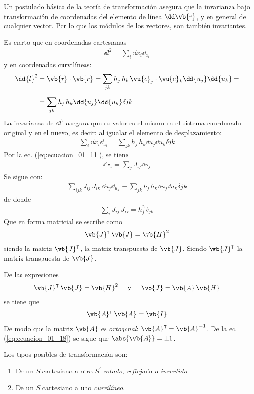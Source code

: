 Un postulado básico de la teoría de transformación asegura que la invarianza bajo transformación de coordenadas del elemento de línea $\dd\vb{r}$, y en general de cualquier vector. Por lo que los módulos de los vectores, son también invariantes.
\par
Es cierto que en coordenadas cartesianas
\begin{align*}
\dd{l}^{2} = \sum_{i} \dd{x_{i}} \dd_{x_{i}}
\end{align*}
y en coordenadas curvilíneas:
\begin{align*}
\dd{l}^{2} &= \vb{r} \cdot \vb{r} = \sum_{jk} h_{j} \, h_{k} \, \vu{e}_{j} \cdot \vu{e}_{k} \dd{u_{j}} \dd{u_{k}} = \\[0.5em]
&= \sum_{jk} h_{j} \, h_{k} \dd{u_{j}} \dd{u_{k}} \delta{jk}
\end{align*}
La invarianza de $\dd{l}^{2}$ asegura que su valor es el mismo en el sistema coordenado original y en el nuevo, es decir: al igualar el elemento de desplazamiento:
\begin{align*}
\sum_{i} \dd{x_{i}} \dd_{x_{i}} = \sum_{jk} h_{j} \, h_{k} \dd{u_{j}} \dd{u_{k}} \delta{jk}
\end{align*}
Por la ec. (\ref{eq:ecuacion_01_11}), se tiene
\begin{align*}
\dd{x_{i}} = \sum_{j} J_{ij} \dd{u_{j}}
\end{align*}
Se sigue con:
\begin{align*}
\sum_{ijk} J_{ij} \, J_{ik} \, \dd{u_{j}} \dd_{u_{k}} = \sum_{jk} h_{j} \, h_{k} \dd{u_{j}} \dd{u_{k}} \delta{jk}
\end{align*}
de donde
\begin{align*}
\sum_{i} J_{ij} \, J_{ik} = h_{j}^{2} \, \delta_{jk}
\end{align*}
Que en forma matricial se escribe como
\begin{align*}
\vb{J}^{\intercal} \, \vb{J} = \vb{H}^{2}
\end{align*}
siendo la matriz $\vb{J}^{\intercal}$, la matriz transpuesta de $\vb{J}$. Siendo $\vb{J}^{\intercal}$ la matriz transpuesta de $\vb{J}$.
\par
De las expresiones
\begin{align*}
\vb{J}^{\intercal} \, \vb{J} = \vb{H}^{2} \hspace{0.5cm} \mbox{y} \hspace{0.5cm} \vb{J} = \vb{A} \, \vb{H}
\end{align*}
se tiene que
\begin{align}
\vb{A}^{\intercal} \, \vb{A} = \vb{I}
\label{eq:ecuacion_01_18}
\end{align}
De modo que la matriz $\vb{A}$ es \emph{ortogonal}: $\vb{A}^{\intercal} = \vb{A}^{-1}$.
De la ec. (\ref{eq:ecuacion_01_18}) se sigue que $\abs{\vb{A}} = \pm 1$.
\par
Los tipos posibles de transformación son:
\begin{enumerate}
\item De un $S$ cartesiano a otro $S^{\prime}$ \emph{rotado, reflejado o invertido}.
\item De un $S$ cartesiano a uno \emph{curvilíneo}.
\end{enumerate}

